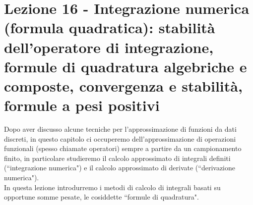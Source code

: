 \section[Lezione 16 - Integrazione numerica, formule di quadratura]{Lezione 16 - Integrazione numerica (formula quadratica): stabilità dell'operatore di integrazione, formule di quadratura algebriche e composte, convergenza e stabilità, formule a pesi positivi}
Dopo aver discusso alcune tecniche per l'approssimazione di funzioni da dati discreti, in questo capitolo ci occuperemo dell'approssimazione di operazioni funzionali (spesso chiamate operatori) sempre a partire da un campionamento finito, in particolare studieremo il calcolo approssimato di integrali definiti (``integrazione numerica") e il calcolo approssimato di derivate (``derivazione numerica").\\
In questa lezione introdurremo i metodi di calcolo di integrali basati su opportune somme pesate, le cosiddette ``formule di quadratura".


